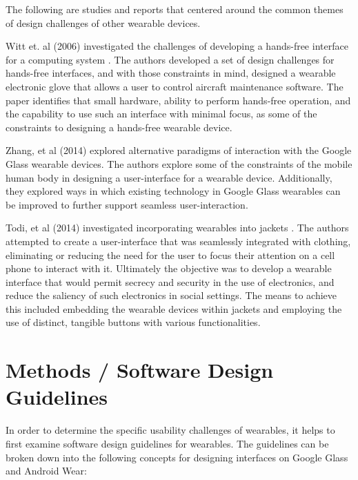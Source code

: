 \documentclass[12pt]{article}
\begin{document}
The following are studies and reports that centered around the common themes of design challenges of other wearable devices.

Witt et. al (2006) investigated the challenges of developing a hands-free interface for a computing system \cite{witt}. The authors developed a set of design challenges for hands-free interfaces, and with those constraints in mind, designed a wearable electronic glove that allows a user to control aircraft maintenance software. The paper identifies that small hardware, ability to perform hands-free operation, and the capability to use such an interface with minimal focus, as some of the constraints to designing a hands-free wearable device.

Zhang, et al (2014) explored alternative paradigms of interaction with the Google Glass wearable devices. The authors explore some of the constraints of the mobile human body in designing a user-interface for a wearable device. Additionally, they explored ways in which existing technology in Google Glass wearables can be improved to further support seamless user-interaction. 

Todi, et al (2014) investigated incorporating wearables into jackets \cite{todi}. The authors attempted to create a user-interface that was seamlessly integrated with clothing, eliminating or reducing the need for the user to focus their attention on a cell phone to interact with it. Ultimately the objective was to develop a wearable interface that would permit secrecy and security in the use of electronics, and reduce the saliency of such electronics in social settings.  The means to achieve this included embedding the wearable devices within jackets and employing the use of distinct, tangible buttons with various functionalities.

\section{Methods / Software Design Guidelines} 

In order to determine the specific usability challenges of wearables, it helps to first examine software design guidelines for wearables. The guidelines can be broken down into the following concepts for designing interfaces on Google Glass and Android Wear:
\end{document}
